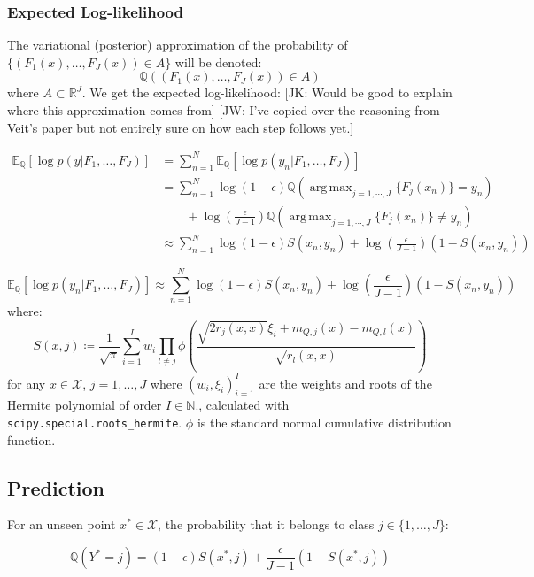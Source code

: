 \documentclass[twoside,11pt]{article}
\newcommand{\jk}[1]{{\color{blue} [JK: #1]}}
\newcommand{\jw}[1]{{\color{gray} [JW: #1]}}
\DeclareMathOperator*{\argmax}{arg\,max}
\begin{document}
\subsubsection{Expected Log-likelihood}\label{subsec:expected-log-likelihood}

The variational (posterior) approximation of the probability of $\{(F_1(x), \dots, F_J(x)) \in A\}$ will be denoted:
\[\mathbb{Q}\left( (F_1(x), \dots, F_J(x)) \in A\right)\]
where $A \subset \mathbb{R}^J$.
We get the expected log-likelihood:
%
\jk{Would be good to explain where this approximation comes from}
\jw{I've copied over the reasoning from Veit's paper but not entirely sure on how each step follows yet.}
%

\begin{align*}
\mathbb{E}_{\mathbb{Q}}\left[ \log p(y | F_1, \dots, F_J)\right] &= \sum_{n=1}^{N}\mathbb{E}_{\mathbb{Q}}\left[ \log p(y_n | F_1, \dots, F_J)\right]\\
&= \sum_{n=1}^{N}\log(1-\epsilon)\mathbb{Q}\left( \argmax_{j=1, \cdots, J} \{F_j(x_n)\} = y_n\right)\\
& \qquad + \log\left(\frac{\epsilon}{J-1}\right)\mathbb{Q}\left( \argmax_{j=1, \cdots, J} \{F_j(x_n)\} \neq y_n\right)\\
&\approx \sum_{n=1}^{N} \log(1-\epsilon)S(x_n, y_n) + \log \left(\frac{\epsilon}{J-1}\right)(1-S(x_n, y_n))
\end{align*}

\[\mathbb{E}_{\mathbb{Q}}\left[ \log p(y_n | F_1, \dots, F_J)\right] \approx \sum_{n=1}^{N} \log(1-\epsilon)S(x_n, y_n) + \log \left(\frac{\epsilon}{J-1}\right)(1-S(x_n, y_n))\]
where:
\[S(x, j) \coloneqq \frac{1}{\sqrt{\pi}} \sum_{i=1}^I w_i \prod_{l\neq j} \phi \left( \frac{\sqrt{2 r_j (x, x)}\xi_i + m_{Q, j}(x) - m_{Q, l}(x)}{\sqrt{r_l (x, x)}}\right)\]
for any $x \in \mathcal{X}$, $j=1, \dots, J$ where $(w_i, \xi_i)_{i=1}^I$ are the weights and roots of the Hermite polynomial of order $I \in \mathbb{N}$., calculated with \verb|scipy.special.roots_hermite|.
$\phi$ is the standard normal cumulative distribution function.

\subsection{Prediction}\label{subsec:gwi-for-multiclass-classification-prediction}

For an unseen point $x^* \in \mathcal{X}$, the probability that it belongs to class $j \in \{1, \dots, J\}$:

\[\mathbb{Q}(Y^* = j) = (1-\epsilon) S(x^*, j) + \frac{\epsilon}{J-1}(1-S(x^*, j))\]
\end{document}
